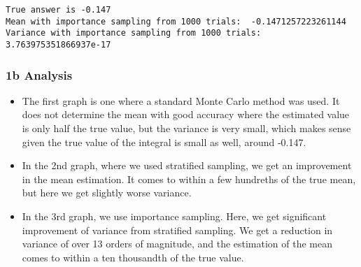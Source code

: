 \documentclass[11pt]{article}
\makeatletter
\providecommand{\tightlist}{%
      \setlength{\itemsep}{0pt}\setlength{\parskip}{0pt}}
\newcommand{\boxspacing}{\kern\kvtcb@left@rule\kern\kvtcb@boxsep}
\newcommand{\prompt}[4]{
        \ttfamily\llap{{\color{#2}[#3]:\hspace{3pt}#4}}\vspace{-\baselineskip}
    }
\makeatother
\begin{document}
    \begin{Verbatim}[commandchars=\\\{\}]
True answer is -0.147
Mean with importance sampling from 1000 trials:  -0.1471257223261144
Variance with importance sampling from 1000 trials:  3.763975351866937e-17
    \end{Verbatim}

    \hypertarget{b-analysis}{%
\subsubsection{1b Analysis}\label{b-analysis}}

    \begin{itemize}
\tightlist
\item
  The first graph is one where a standard Monte Carlo method was used.
  It does not determine the mean with good accuracy where the estimated
  value is only half the true value, but the variance is very small,
  which makes sense given the true value of the integral is small as
  well, around -0.147.
\item
  In the 2nd graph, where we used stratified sampling, we get an
  improvement in the mean estimation. It comes to within a few hundreths
  of the true mean, but here we get slightly worse variance.
\item
  In the 3rd graph, we use importance sampling. Here, we get significant
  improvement of variance from stratified sampling. We get a reduction
  in variance of over 13 orders of magnitude, and the estimation of the
  mean comes to within a ten thousandth of the true value.
\end{itemize}

    \begin{tcolorbox}[breakable, size=fbox, boxrule=1pt, pad at break*=1mm,colback=cellbackground, colframe=cellborder]
\prompt{In}{incolor}{ }{\boxspacing}
\begin{Verbatim}[commandchars=\\\{\}]

\end{Verbatim}
\end{tcolorbox}


    
    
    
\end{document}
